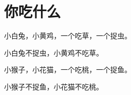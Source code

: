 \documentclass[12pt,UTF-8,openany]{ctexbook}
\begin{document}
\clearpage

\begin{center}
    
\end{center}


\hanzibox{}\hanzibox{}\hanzibox{}\hanzibox{}\hspace{1em}\hanzibox{}\hanzibox{}\hanzibox{}\hanzibox{}

\hanzibox{}\hanzibox{}\hanzibox{}\hanzibox{}\hspace{1em}\hanzibox{}\hanzibox{}\hanzibox{}\hanzibox{}

\hanzibox{}\hanzibox{}\hanzibox{}\hanzibox{}\hspace{1em}\hanzibox{}\hanzibox{}\hanzibox{}\hanzibox{}

\hanzibox{}\hanzibox{}\hanzibox{}\hanzibox{}\hspace{1em}\hanzibox{}\hanzibox{}\hanzibox{}\hanzibox{}






\chapter{你吃什么}

\begin{large}
    
    小白兔，小黄鸡，一个吃草，一个捉虫。
    
    小白兔不捉虫，小黄鸡不吃草。
    
    小猴子，小花猫，一个吃桃，一个捉鱼。
    
    小猴子不捉鱼，小花猫不吃桃。
    
\end{large}


\clearpage

\begin{center}
    
    
    
\end{center}


\hanzibox{}\hanzibox{}\hanzibox{}\hanzibox{}\hspace{1em}\hanzibox{}\hanzibox{}\hanzibox{}\hanzibox{}
\end{document}
